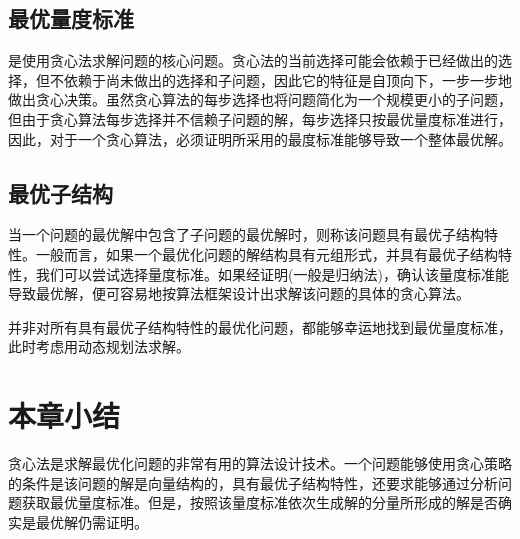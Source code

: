 \subsection*{最优量度标准}
是使用贪心法求解问题的核心问题。贪心法的当前选择可能会依赖于已经做出的选择，但不依赖于尚未做出的选择和子问题，因此它的特征是自顶向下，一步一步地做出贪心决策。虽然贪心算法的每步选择也将问题简化为一个规模更小的子问题，但由于贪心算法每步选择并不信赖子问题的解，每步选择只按最优量度标准进行，因此，对于一个贪心算法，必须证明所采用的最度标准能够导致一个整体最优解。
\subsection*{最优子结构}
当一个问题的最优解中包含了子问题的最优解时，则称该问题具有最优子结构特性。一般而言，如果一个最优化问题的解结构具有元组形式，并具有最优子结构特性，我们可以尝试选择量度标准。如果经证明(一般是归纳法)，确认该量度标准能导致最优解，便可容易地按算法框架设计出求解该问题的具体的贪心算法。

并非对所有具有最优子结构特性的最优化问题，都能够幸运地找到最优量度标准，此时考虑用动态规划法求解。

\section{本章小结}
贪心法是求解最优化问题的非常有用的算法设计技术。一个问题能够使用贪心策略的条件是该问题的解是向量结构的，具有最优子结构特性，还要求能够通过分析问题获取最优量度标准。但是，按照该量度标准依次生成解的分量所形成的解是否确实是最优解仍需证明。